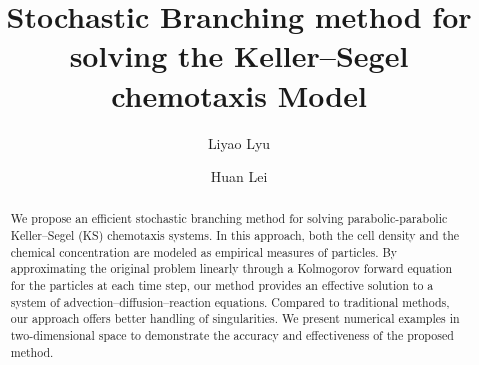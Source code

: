 \documentclass[preprint,12pt]{elsarticle}
\theoremstyle{definition}
\theoremstyle{remark}
\begin{document}
\begin{frontmatter}



\title{Stochastic Branching method for solving the Keller--Segel chemotaxis Model}


\author[1,2]{Liyao Lyu}
\author[2,3]{Huan Lei}

\address[1]{{Department of Mathematics, University of California, Los Angeles}, 520 Portola Plaza, Los Angeles, CA, USA}

\address[2]{{Department of Computational Mathematics, Science \& Engineering, Michigan State University}, 428 S Shaw Ln, East Lansing, MI, USA}

\address[3]{{Department of Statistics \& Probability, Michigan State University}, 619 Red Cedar Road, East Lansing, MI, USA}


\begin{abstract}
We propose an efficient stochastic branching method for solving parabolic-parabolic Keller--Segel (KS) chemotaxis systems. In this approach, both the cell density and the chemical concentration are modeled as empirical measures of particles. By approximating the original problem linearly through a Kolmogorov forward equation for the particles at each time step, our method provides an effective solution to a system of advection--diffusion--reaction equations. Compared to traditional methods, our approach offers better handling of singularities. We present numerical examples in two-dimensional space to demonstrate the accuracy and effectiveness of the proposed method.
\end{abstract}


\end{frontmatter}
\end{document}
